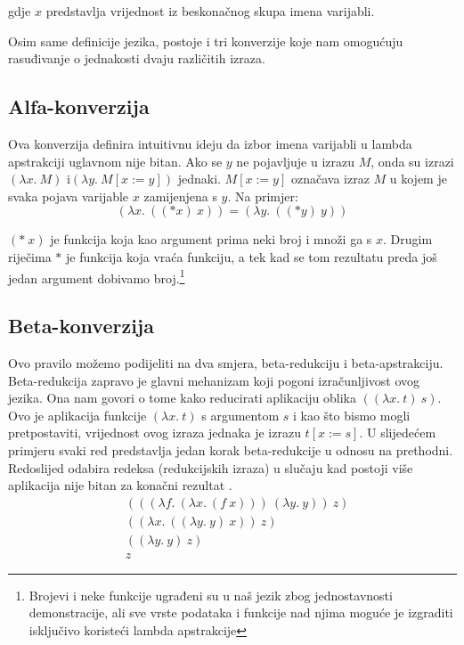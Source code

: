 \documentclass[diplomskirad,upload]{fer}
\begin{document}
gdje \(x\) predstavlja vrijednost iz beskonačnog skupa imena varijabli.

Osim same definicije jezika, postoje i tri konverzije koje nam omogućuju
rasuđivanje o jednakosti dvaju različitih izraza.

\subsection{Alfa-konverzija}

Ova konverzija definira intuitivnu ideju da izbor imena varijabli u lambda
apstrakciji uglavnom nije bitan. Ako se \(y\) ne pojavljuje u izrazu \(M\), onda su
izrazi \((\lambda x.\ M)\) i\break \((\lambda y.\ M[x:=y])\) jednaki. \(M[x:=y]\) označava
izraz \(M\) u kojem je svaka pojava varijable \(x\) zamijenjena s \(y\). Na primjer:
\[
    (\lambda x.\ ((* x)\ x)) = (\lambda y.\ ((* y)\ y))
\]

\((*\ x)\) je funkcija koja kao argument prima neki broj i množi ga s \(x\).
Drugim riječima \(*\) je funkcija koja vraća funkciju, a tek kad se tom
rezultatu preda još jedan argument dobivamo broj.\footnote{Brojevi i neke
funkcije ugrađeni su u naš jezik zbog jednostavnosti demonstracije, ali sve
vrste podataka i funkcije nad njima moguće je izgraditi isključivo koristeći
lambda apstrakcije}

\subsection{Beta-konverzija}

Ovo pravilo možemo podijeliti na dva smjera, beta-redukciju i beta-apstrakciju.
Beta-redukcija zapravo je glavni mehanizam koji pogoni izračunljivost ovog
jezika. Ona nam govori o tome kako reducirati aplikaciju oblika
\(((\lambda x.\ t)\ s)\). Ovo je aplikacija funkcije \((\lambda x.\ t)\) s
argumentom \(s\) i kao što bismo mogli pretpostaviti, vrijednost ovog izraza
jednaka je izrazu \(t[x:=s]\). U slijedećem primjeru svaki red predstavlja jedan
korak beta-redukcije u odnosu na prethodni. Redoslijed odabira redeksa (redukcijskih izraza) u
slučaju kad postoji više aplikacija nije bitan za konačni rezultat
\cite{ce15f5c7-12e9-3586-af6c-63c4f99b8176}.
\begin{align*}
    &(((\lambda f.\ (\lambda x.\ (f\ x)))\ (\lambda y.\ y))\ z) \\
    &((\lambda x.\ ((\lambda y.\ y)\ x))\ z) \\
    &((\lambda y.\ y)\ z) \\
    &z
\end{align*}
\end{document}
